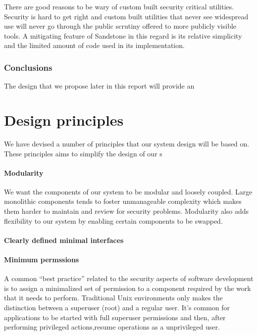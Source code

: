 There are good reasons to be wary of custom built security
critical utilities. Security is hard to get right and custom built
utilities that never see widespread use will never go through the
public scrutiny offered to more publicly visible tools. A mitigating
feature of Sandstone in this regard is its relative simplicity and the
limited amount of code used in its implementation.

\subsubsection{Conclusions}


The design that we propose later in this report will provide an


\section{Design principles}
We have devised a number of principles that our system design will be
based on. These principles aims to simplify the design of our s

\paragraph{Modularity}
We want the components of our system to be modular and loosely
coupled. Large monolithic components tends to foster unmanageable
complexity which makes them harder to maintain and review for security
problems.
Modularity also adds flexibility to our system by enabling certain
components to be swapped.

\paragraph{Clearly defined minimal interfaces}


\paragraph{Minimum permssions}
A common "`best practice"' related to the security aspects of software
development is to assign a minimalized set of permission to a
component required by the work that it needs to perform. Traditional
Unix environments only makes the distinction between a superuser (root)
and a regular user. It's common for applications to be started with
full superuser permissions and then, after performing privileged
actions,resume operations as a unprivileged user.

